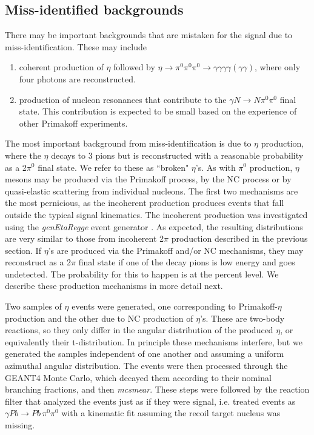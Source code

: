 \subsection{Miss-identified backgrounds}
There may be important backgrounds that are mistaken for the signal due to miss-identification. These may include
\begin{enumerate}[label=(\roman*)]
    \item coherent production of $\eta$ followed by $\eta\rightarrow \pi^0\pi^0\pi^0 \rightarrow \gamma\gamma\gamma\gamma(\gamma\gamma)$, where only four photons are reconstructed.
    \item production of nucleon resonances that contribute to the $\gamma N \rightarrow N \pi^0\pi^0$ final state. This contribution is expected to be small based on the experience of other Primakoff experiments.
\end{enumerate}
The most important background from miss-identification is due to $\eta$ production, where the $\eta$ decays to 3 pions but is reconstructed with a reasonable probability as a 2$\pi^0$ final state. We refer to these as ``broken" $\eta$'s. As with $\pi^0$ production, $\eta$ mesons may be produced via the Primakoff process, by the NC process or by quasi-elastic scattering from individual nucleons. The first two mechanisms are the most pernicious, as the incoherent production produces events that fall outside the typical signal kinematics. 
The incoherent production was investigated using the {\em genEtaRegge} event generator \cite{hdnote2437}. As expected, the resulting distributions are very similar to those from incoherent 2$\pi$ production described in the previous section.
If $\eta$'s are produced via the Primakoff and/or NC mechanisms, they may reconstruct as a 2$\pi$ final state if one of the decay pions is low energy and goes undetected. The probability for this to happen is at the percent level.  We describe these production mechanisms in more detail next.

Two samples of $\eta$ events were generated, one corresponding to Primakoff-$\eta$ production and the other due to NC production of $\eta$'s. These are two-body reactions, so they only differ in the angular distribution of the produced $\eta$, or equivalently their t-distribution. In principle these mechanisms interfere, but we generated the samples independent of one another and assuming a uniform azimuthal angular distribution. The events were then processed through the GEANT4 Monte Carlo, which decayed them according to their nominal branching fractions, and then {\em mcsmear}. These steps were followed by the reaction filter that analyzed the events just as if they were signal, i.e. treated events as $\gamma Pb \rightarrow Pb\, \pi^0 \pi^0$ with a kinematic fit assuming the recoil target nucleus was missing. 

